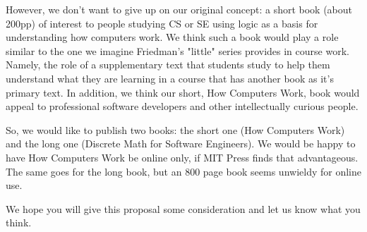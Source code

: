 \documentclass[letterpaper,10pt,extrafontsizesmtwoside,onecolumn,openright,fleqn]{memoir}
\begin{document}
However, we don't want to give up on our original concept: a short book (about 200pp) of interest to people studying CS or SE using logic as a basis for understanding how computers work. We think such a book would play a role similar to the one we imagine Friedman's "little" series provides in course work. Namely, the role of a supplementary text that students study to help them understand what they are learning in a course that has another book as it's primary text. In addition, we think our short, How Computers Work, book would appeal to professional software developers and other intellectually curious people.

So, we would like to publish two books: the short one (How Computers Work) and the long one (Discrete Math for Software Engineers). We would be happy to have How Computers Work be online only, if MIT Press finds that advantageous. The same goes for the long book, but an 800 page book seems unwieldy for online use.

We hope you will give this proposal some consideration and let us know what you think.
\end{document}
